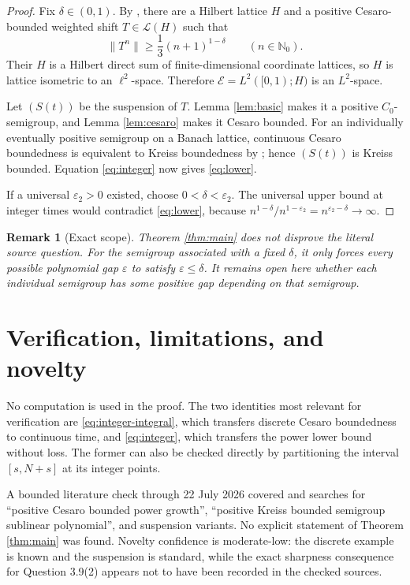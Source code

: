 \documentclass[11pt]{article}
\newtheorem{remark}[theorem]{Remark}
\newcommand{\N}{\mathbb N}
\newcommand{\E}{\mathcal E}
\begin{document}
\begin{proof}
Fix $\delta\in(0,1)$.  By \cite[Theorems 2.2 and 2.3]{BonillaMuller}, there
are a Hilbert lattice $H$ and a positive Cesaro-bounded weighted shift
$T\in\mathcal L(H)$ such that
\[
  \|T^n\|\geq\frac13(n+1)^{1-\delta}
  \qquad(n\in\N_0).
\]
Their $H$ is a Hilbert direct sum of finite-dimensional coordinate lattices,
so $H$ is lattice isometric to an $\ell^2$-space.  Therefore
$\E=L^2([0,1);H)$ is an $L^2$-space.

Let $(S(t))$ be the suspension of $T$.  Lemma \ref{lem:basic} makes it a
positive $C_0$-semigroup, and Lemma \ref{lem:cesaro} makes it Cesaro bounded.
For an individually eventually positive semigroup on a Banach lattice,
continuous Cesaro boundedness is equivalent to Kreiss boundedness by
\cite[Proposition 2.6]{ArnoldCoine}; hence $(S(t))$ is Kreiss bounded.
Equation \eqref{eq:integer} now gives \eqref{eq:lower}.

If a universal $\varepsilon_2>0$ existed, choose
$0<\delta<\varepsilon_2$.  The universal upper bound at integer times would
contradict \eqref{eq:lower}, because
$n^{1-\delta}/n^{1-\varepsilon_2}=n^{\varepsilon_2-\delta}\to\infty$.
\end{proof}

\begin{remark}[Exact scope]
Theorem \ref{thm:main} does not disprove the literal source question.  For the
semigroup associated with a fixed $\delta$, it only forces every possible
polynomial gap $\varepsilon$ to satisfy $\varepsilon\leq\delta$.  It remains
open here whether each individual semigroup has some positive gap depending on
that semigroup.
\end{remark}

\section{Verification, limitations, and novelty}

No computation is used in the proof.  The two identities most relevant for
verification are \eqref{eq:integer-integral}, which transfers discrete Cesaro
boundedness to continuous time, and \eqref{eq:integer}, which transfers the
power lower bound without loss.  The former can also be checked directly by
partitioning the interval $[s,N+s]$ at its integer points.

A bounded literature check through 22 July 2026 covered
\cite{ArnoldCoine,BonillaMuller,CCEL,ArnoldCuny,Arora} and searches for
``positive Cesaro bounded power growth'', ``positive Kreiss bounded semigroup
sublinear polynomial'', and suspension variants.  No explicit statement of
Theorem \ref{thm:main} was found.  Novelty confidence is moderate-low: the
discrete example is known and the suspension is standard, while the exact
sharpness consequence for Question 3.9(2) appears not to have been recorded in
the checked sources.
\end{document}
